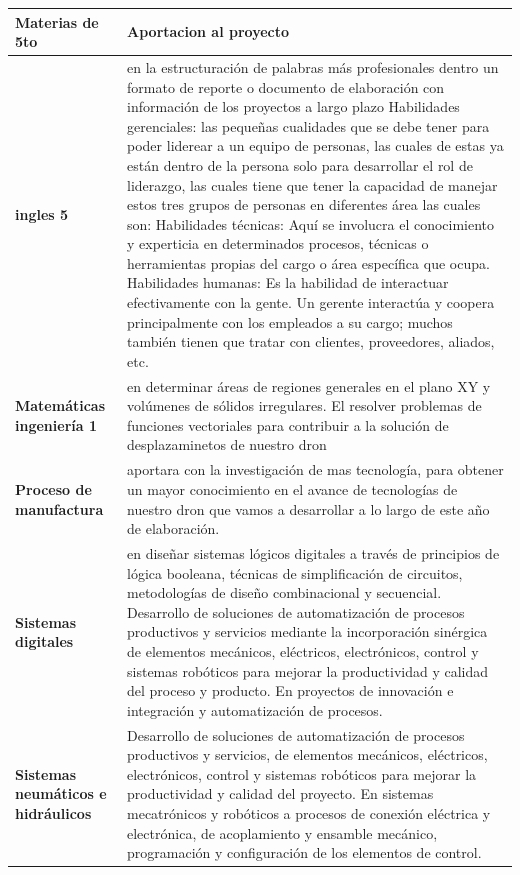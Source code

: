 \documentclass[11pt,a4paper]{article}
\begin{document}
\newpage
\begin{tabular}{|p{5.5cm}|p{7cm}|}
\hline 
\textbf{Materias de 5to} & \textbf{Aportacion al proyecto} \\ \hline
\textbf{ingles 5} & en la estructuración de palabras más profesionales dentro un formato de reporte o documento de elaboración con información de los proyectos a largo plazo 
Habilidades gerenciales: las pequeñas cualidades que se debe tener para poder liderear a un equipo de personas, las cuales de estas ya están dentro de la persona solo para desarrollar el rol de liderazgo, las cuales tiene que tener la capacidad de manejar estos tres grupos de personas en diferentes área las cuales son:  
Habilidades técnicas: Aquí se involucra el conocimiento y experticia en determinados procesos, técnicas o herramientas propias del cargo o área específica que ocupa.
Habilidades humanas:
Es la habilidad de interactuar efectivamente con la gente. Un gerente interactúa y coopera principalmente con los empleados a su cargo; muchos también tienen que tratar con clientes, proveedores, aliados, etc.
 \\ \hline
\textbf{Matemáticas ingeniería 1} & en determinar  áreas de regiones generales en el plano XY y volúmenes de sólidos irregulares. El resolver problemas de funciones vectoriales para contribuir a la solución de desplazaminetos de nuestro dron  \\ \hline
\textbf{Proceso de manufactura} & aportara con la investigación de mas tecnología, para obtener un mayor conocimiento en el avance de tecnologías de nuestro dron que vamos a desarrollar a lo largo de este año de elaboración. \\ \hline
\textbf{Sistemas digitales} & en diseñar sistemas lógicos digitales a través de principios de lógica booleana, técnicas de simplificación de circuitos, metodologías de diseño combinacional y secuencial. Desarrollo de soluciones de automatización de procesos productivos y servicios mediante la incorporación sinérgica de elementos mecánicos, eléctricos, electrónicos, control y sistemas robóticos para mejorar la productividad y calidad del proceso y producto. En proyectos de innovación e integración y automatización de procesos.  \\ \hline
\textbf{Sistemas neumáticos e hidráulicos} & Desarrollo de soluciones de automatización de procesos productivos y servicios, de elementos mecánicos, eléctricos, electrónicos, control y sistemas robóticos para mejorar la productividad y calidad del proyecto. En sistemas mecatrónicos y robóticos a procesos  de conexión eléctrica y electrónica, de acoplamiento y ensamble mecánico, programación y configuración de los elementos de control.  \\ \hline

\end{tabular}
\end{document}
